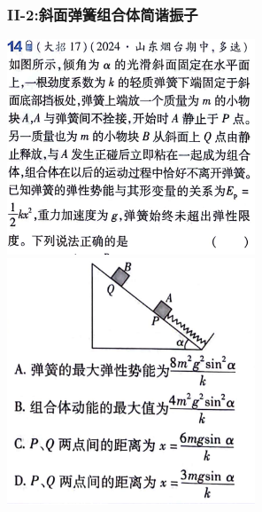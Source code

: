 \documentclass{article}
\begin{document}
\subsubsection{II-2:斜面弹簧组合体简谐振子}
\includegraphics[width = 20em]{./pictures/2.1-7.png}
\hspace{2em}
\includegraphics[width = 20em]{./pictures/2.1-8.png}
\end{document}
